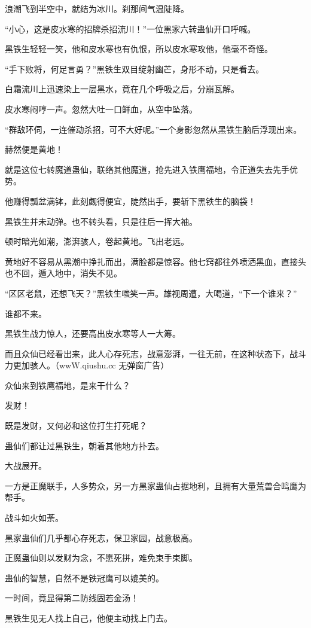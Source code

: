 \begin{this_body}
浪潮飞到半空中，就结为冰川。刹那间气温陡降。

“小心，这是皮水寒的招牌杀招流川！”一位黑家六转蛊仙开口呼喊。

黑铁生轻轻一笑，他和皮水寒也有仇恨，所以皮水寒攻他，他毫不奇怪。

“手下败将，何足言勇？”黑铁生双目绽射幽芒，身形不动，只是看去。

白霜流川上迅速染上一层黑水，竟在几个呼吸之后，分崩瓦解。

皮水寒闷哼一声。忽然大吐一口鲜血，从空中坠落。

“群敌环伺，一连催动杀招，可不大好呢。”一个身影忽然从黑铁生脑后浮现出来。

赫然便是黄地！

就是这位七转魔道蛊仙，联络其他魔道，抢先进入铁鹰福地，令正道失去先手优势。

他赚得瓢盆满钵，此刻觑得便宜，陡然出手，要斩下黑铁生的脑袋！

黑铁生并未动弹。也不转头看，只是往后一挥大袖。

顿时暗光如潮，澎湃骇人，卷起黄地。飞出老远。

黄地好不容易从黑潮中挣扎而出，满脸都是惊容。他七窍都往外喷洒黑血，直接头也不回，遁入地中，消失不见。

“区区老鼠，还想飞天？”黑铁生嗤笑一声。雄视周遭，大喝道，“下一个谁来？”

谁都不来。

黑铁生战力惊人，还要高出皮水寒等人一大筹。

而且众仙已经看出来，此人心存死志，战意澎湃，一往无前，在这种状态下，战斗力更加骇人。（wwW.qiushu.cc 无弹窗广告）

众仙来到铁鹰福地，是来干什么？

发财！

既是发财，又何必和这位打生打死呢？

蛊仙们都让过黑铁生，朝着其他地方扑去。

大战展开。

一方是正魔联手，人多势众，另一方黑家蛊仙占据地利，且拥有大量荒兽合鸣鹰为帮手。

战斗如火如荼。

黑家蛊仙们几乎都心存死志，保卫家园，战意极高。

正魔蛊仙则以发财为念，不愿死拼，难免束手束脚。

蛊仙的智慧，自然不是铁冠鹰可以媲美的。

一时间，竟显得第二防线固若金汤！

黑铁生见无人找上自己，他便主动找上门去。


\end{this_body}
